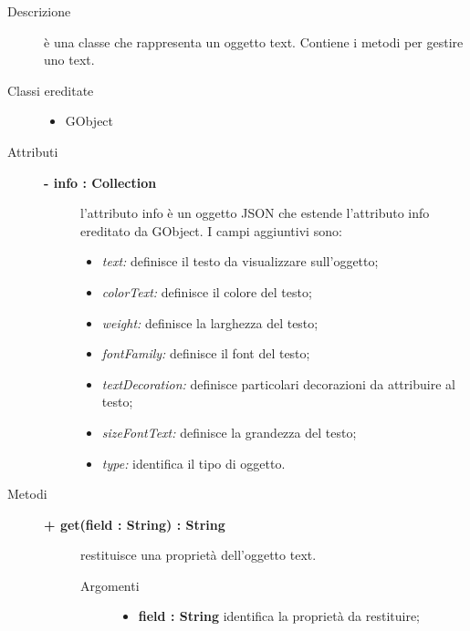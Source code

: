 \begin{description}
\item[Descrizione] \hfill
	è una classe che rappresenta un oggetto text. Contiene i metodi per gestire uno text.
	
\item[Classi ereditate] \hfill
	\begin{itemize}
		\item GObject
	\end{itemize}
	
\item[Attributi] \hfill
	\begin{description}
		\item[\textbf{- info : Collection			}] \hfill
			l'attributo info è un oggetto JSON che estende l'attributo info ereditato da GObject. I campi aggiuntivi sono:
	\begin{itemize}
		\item \textit{text:} definisce il testo da visualizzare sull'oggetto;
		\item \textit{colorText:} definisce il colore del testo;		
		\item \textit{weight:} definisce la larghezza del testo;
        \item \textit{fontFamily:} definisce il font del testo;
        \item \textit{textDecoration:} definisce particolari decorazioni da attribuire al testo; 
        \item \textit{sizeFontText:} definisce la grandezza del testo;
		\item \textit{type:} identifica il tipo di oggetto.		
	\end{itemize}
	\end{description}
	
\item[Metodi] \hfill

\begin{description}
		\item[\textbf{\color{blue}+ get(field : String) : String			}] \hfill
			restituisce una proprietà dell'oggetto text.
			
		\begin{description}
			\item[Argomenti] \hfill
				\begin{itemize}
				
					\item \textbf{field : String			} \hfill
					identifica la proprietà da restituire;
				\end{itemize}
		\end{description}


\end{description}
\end{description}
